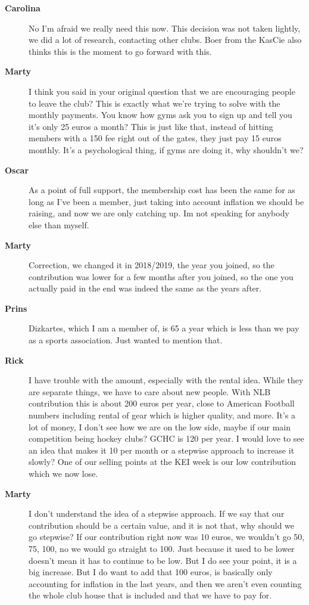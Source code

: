 \documentclass[12pt, a4paper]{article}
\newcommand{\speak}[2]{\begin{description}\item[\textbf{#1}]#2\end{description}}
\begin{document}
\speak{Carolina}{No I'm afraid we really need this now. This decision was not taken lightly, we did a lot of research, contacting other clubs. Boer from the KasCie also thinks this is the moment to go forward with this.}

\speak{Marty}{I think you said in your original question that we are encouraging people to leave the club? This is exactly what we're trying to solve with the monthly payments. You know how gyms ask you to sign up and tell you it's only 25 euros a month? This is just like that, instead of hitting members with a 150 fee right out of the gates, they just pay 15 euros monthly. It's a psychological thing, if gyms are doing it, why shouldn't we?}

\speak{Oscar}{As a point of full support, the membership cost has been the same for as long as I've been a member, just taking into account inflation we should be raising, and now we are only catching up. Im not speaking for anybody else than myself.}

\speak{Marty}{Correction, we changed it in 2018/2019, the year you joined, so the contribution was lower for a few months after you joined, so the one you actually paid in the end was indeed the same as the years after.}


\speak{Prins}{Dizkartes, which I am a member of, is 65 a year which is less than we pay as a sports association. Just wanted to mention that.}

\speak{Rick}{I have trouble with the amount, especially with the rental idea. While they are separate things, we have to care about new people. With NLB contribution this is about 200 euros per year, close to American Football numbers including rental of gear which is higher quality, and more. It's a lot of money, I don't see how we are on the low side, maybe if our main competition being hockey clubs? GCHC is 120 per year. I would love to see an idea that makes it 10 per month or a stepwise approach to increase it slowly? One of our selling points at the KEI week is our low contribution which we now lose.}

\speak{Marty}{I don't understand the idea of a stepwise approach. If we say that our contribution should be a certain value, and it is not that, why should we go stepwise? If our contribution right now was 10 euros, we wouldn't go 50, 75, 100, no we would go straight to 100. Just because it used to be lower doesn't mean it has to continue to be low. But I do see your point, it is a big increase. But I do want to add that 100 euros, is basically only accounting for inflation in the last years, and then we aren't even counting the whole club house that is included and that we have to pay for.}
\end{document}
